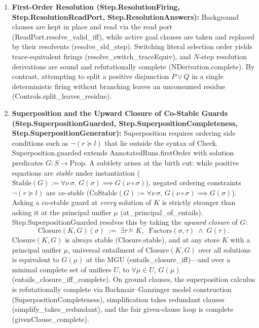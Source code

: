 \documentclass[11pt,a4paper]{article}
\theoremstyle{definition}
\DeclareRobustCommand{\lean}[1]{%
  \ifmmode\text{\normalfont\ttfamily\footnotesize\detokenize{#1}}%
  \else{\normalfont\footnotesize\leanurl{#1}}\fi}
\def\lean#1{#1}%
\begin{document}
\begin{enumerate}[leftmargin=2em, nosep]
  \item \textbf{First-Order Resolution (\lean{Step.ResolutionFiring}, \lean{Step.ResolutionReadPort}, \lean{Step.ResolutionAnswers}):}
  Background clauses are kept in place and read via the read port (\lean{ReadPort.resolve_valid_iff}), while active goal clauses are taken and replaced by their resolvents (\lean{resolve_sld_step}). Switching literal selection order yields trace-equivalent firings (\lean{resolve_switch_traceEquiv}), and $N$-step resolution derivations are sound and refutationally complete (\lean{NDerivation.complete}). By contrast, attempting to split a positive disjunction $P \lor Q$ in a single deterministic firing without branching leaves an unconsumed residue (\lean{Controls.split_leaves_residue}).

  \item \textbf{Superposition and the Upward Closure of Co-Stable Guards (\lean{Step.SuperpositionGuarded}, \lean{Step.SuperpositionCompleteness}, \lean{Step.SuperpositionGenerator}):}
  Superposition requires ordering side conditions such as $\neg(r \succeq l)$ that lie outside the syntax of \lean{Check}. \lean{Superposition.guarded} extends \lean{AnnotatedRuns.firstOrder} with solution predicates $G : S \to \mathrm{Prop}$. A subtlety arises at the birth cut: while positive equations are \emph{stable} under instantiation ($\mathrm{Stable}(G) := \forall \nu\,\sigma,\, G(\sigma) \implies G(\nu \circ \sigma)$), negated ordering constraints $\neg(r \succeq l)$ are \emph{co-stable} ($\mathrm{CoStable}(G) := \forall \nu\,\sigma,\, G(\nu \circ \sigma) \implies G(\sigma)$). Asking a co-stable guard at \emph{every} solution of $K$ is strictly stronger than asking it at the principal unifier $\mu$ (\lean{at_principal_of_entails}). \lean{Step.SuperpositionGuarded} resolves this by taking the \emph{upward closure} of $G$:
  \[
    \mathrm{Closure}(K, G)(\sigma) \;:=\; \exists \tau \models K,\;\; \mathrm{Factors}(\sigma, \tau) \;\land\; G(\tau).
  \]
  $\mathrm{Closure}(K, G)$ is always stable (\lean{Closure.stable}), and at any store $K$ with a principal unifier $\mu$, universal entailment of $\mathrm{Closure}(K, G)$ over all solutions is equivalent to $G(\mu)$ at the MGU (\lean{entails_closure_iff})---and over a minimal complete set of unifiers $U$, to $\forall \mu \in U,\, G(\mu)$ (\lean{entails_closure_iff_complete}). On ground clauses, the superposition calculus is refutationally complete via Bachmair--Ganzinger model construction (\lean{SuperpositionCompleteness}), simplification takes redundant clauses (\lean{simplify_takes_redundant}), and the fair given-clause loop is complete (\lean{givenClause_complete}).


\end{enumerate}
\end{document}
